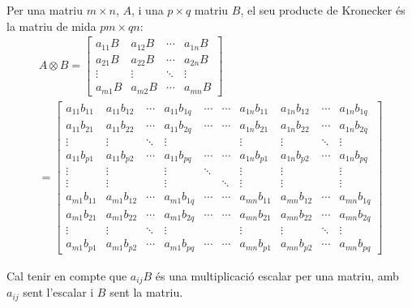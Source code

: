 Per una matriu $m \times n$, $A$, i una $p \times q$ matriu $B$, el seu producte de Kronecker \cite{QCandQI:kronecker} és la matriu de mida $pm \times qn$: 
\begin{multline*}
A \otimes B = \begin{bmatrix}
	a_{11} B & a_{12} B & \cdots & a_{1n}B \\
	a_{21} B & a_{22} B & \cdots & a_{2n}B \\
	\vdots & \vdots & \ddots &           \vdots \\
	a_{m1} B & a_{m2} B & \cdots & a_{mn} B
\end{bmatrix} \\
= \begin{bmatrix}
a_{11} b_{11} & a_{11} b_{12} & \cdots & a_{11} b_{1q} &
\cdots & \cdots & a_{1n} b_{11} & a_{1n} b_{12} & \cdots & a_{1n} b_{1q} \\
a_{11} b_{21} & a_{11} b_{22} & \cdots & a_{11} b_{2q} &
\cdots & \cdots & a_{1n} b_{21} & a_{1n} b_{22} & \cdots & a_{1n} b_{2q} \\
\vdots & \vdots & \ddots & \vdots & & & \vdots & \vdots & \ddots & \vdots \\
a_{11} b_{p1} & a_{11} b_{p2} & \cdots & a_{11} b_{pq} &
\cdots & \cdots & a_{1n} b_{p1} & a_{1n} b_{p2} & \cdots & a_{1n} b_{pq} \\
\vdots & \vdots & & \vdots & \ddots & & \vdots & \vdots & & \vdots \\
\vdots & \vdots & & \vdots & & \ddots & \vdots & \vdots & & \vdots \\
a_{m1} b_{11} & a_{m1} b_{12} & \cdots & a_{m1} b_{1q} &
\cdots & \cdots & a_{mn} b_{11} & a_{mn} b_{12} & \cdots & a_{mn} b_{1q} \\
a_{m1} b_{21} & a_{m1} b_{22} & \cdots & a_{m1} b_{2q} &
\cdots & \cdots & a_{mn} b_{21} & a_{mn} b_{22} & \cdots & a_{mn} b_{2q} \\
\vdots & \vdots & \ddots & \vdots & & & \vdots & \vdots & \ddots & \vdots \\
a_{m1} b_{p1} & a_{m1} b_{p2} & \cdots & a_{m1} b_{pq} &
\cdots & \cdots & a_{mn} b_{p1} & a_{mn} b_{p2} & \cdots & a_{mn} b_{pq}
\end{bmatrix}
\end{multline*}

Cal tenir en compte que $a_{ij}B$ és una multiplicació escalar per una matriu, amb $a_{ij}$ sent l'escalar i $B$ sent la matriu. 

